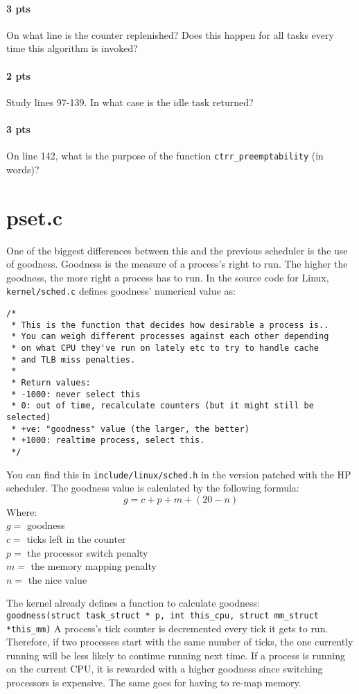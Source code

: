 \documentclass[letterpaper,10pt]{article}
\begin{document}
\paragraph{3 pts} On what line is the counter replenished? Does this happen for all tasks
every time this algorithm is invoked?
\paragraph{2 pts} Study lines 97-139. In what case is the idle task returned?
\paragraph{3 pts} On line 142, what is the purpose of the function \verb=ctrr_preemptability= (in words)?

\section{pset.c}
One of the biggest differences between this and the previous scheduler is the use of
goodness. Goodness is the measure of a process's right to run. The higher the
goodness, the more right a process has to run. In the source code for Linux,
\verb=kernel/sched.c= defines goodness' numerical value as:
\begin{verbatim}
/*
 * This is the function that decides how desirable a process is..
 * You can weigh different processes against each other depending
 * on what CPU they've run on lately etc to try to handle cache
 * and TLB miss penalties.
 *
 * Return values:
 * -1000: never select this
 * 0: out of time, recalculate counters (but it might still be selected)
 * +ve: "goodness" value (the larger, the better)
 * +1000: realtime process, select this.
 */
\end{verbatim}
You can find this in \verb=include/linux/sched.h= in the version patched with the HP scheduler.
The goodness value is calculated by the following formula:
\[ g = c + p +m + (20 - n) \]
Where: \\
$g = $ goodness \\
$c = $ ticks left in the counter \\
$p = $ the processor switch penalty \\
$m = $ the memory mapping penalty \\
$n = $ the nice value

The kernel already defines a function to calculate goodness: \\
\verb=goodness(struct task_struct * p, int this_cpu, struct mm_struct *this_mm)=
A process's tick counter is decremented every tick it gets to run. Therefore, if two
processes start with the same number of ticks, the one currently running will be less
likely to continue running next time. If a process is running on the current CPU, it is
rewarded with a higher goodness since switching processors is expensive. The same
goes for having to re-map memory.
\end{document}
